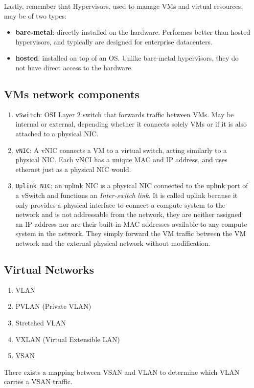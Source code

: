 Lastly, remember that Hypervisors, used to manage VMs and virtual resources, may be of two types:
\begin{itemize}
   \item \textbf{bare-metal}: directly installed on the hardware. Performes better than hosted hypervisors, and typically are designed for enterprise datacenters.
   \item \textbf{hosted}: installed on top of an OS. Unlike bare-metal hypervisors, they do not have direct access to the hardware.
\end{itemize}

\subsection{VMs network components}
\begin{enumerate}
   \item \texttt{vSwitch}: OSI Layer 2 switch that forwards traffic between VMs. May be internal or external, depending whether it connects solely VMs or if it is also attached to a physical NIC.
   \item \texttt{vNIC}: A vNIC connects a VM to a virtual switch, acting similarly to a physical NIC. Each vNCI has a unique MAC and IP address, and uses ethernet just as a physical NIC would.
   \item \texttt{Uplink NIC}: an uplink NIC is a physical NIC connected to the uplink port of a vSwitch and functions an \textit{Inter-switch link}.
   It is called uplink because it only provides a physical interface to connect a compute system to the network and is not addressable from the network, they are neither assigned an IP address nor are their built-in MAC addresses available to any compute system in the network. 
   They simply forward the VM traffic between the VM network and the external physical network without modification.
\end{enumerate}

\subsection{Virtual Networks}
\begin{enumerate}
   \item VLAN
   \item PVLAN (Private VLAN)
   \item Stretched VLAN 
   \item VXLAN (Virtual Extensible LAN)
   \item VSAN
\end{enumerate}
There exists a mapping between VSAN and VLAN to determine which VLAN carries a VSAN traffic.


